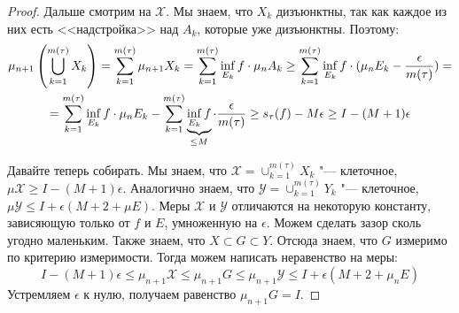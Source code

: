 \begin{proof}
	Дальше смотрим на $\mathcal{X}$.
	Мы знаем, что $X_k$ дизъюнктны, так как каждое из них есть <<надстройка>> над $A_k$, которые уже дизъюнктны.
	Поэтому:
	\begin{gather*}
	\mu_{n+1} \left( \bigcup_{k=1}^{m(\tau)} X_k \right)
	= \sum_{k=1}^{m(\tau)} \mu_{n+1} X_k
	= \sum_{k=1}^{m(\tau)} \inf_{E_k} f \cdot \mu_n A_k
	\ge \sum_{k=1}^{m(\tau)} \inf_{E_k} f \cdot (\mu_n E_k - \frac{\epsilon}{m(\tau)}) = \\
	= \sum_{k=1}^{m(\tau)} \inf_{E_k} f \cdot \mu_n E_k - \sum_{k=1}^{m(\tau)} \underbrace{\inf_{E_k} f}_{\le M} \cdot \frac{\epsilon}{m(\tau)}
	\ge s_\tau(f) - M \epsilon
	\ge I - (M+1)\epsilon
	\end{gather*}

	Давайте теперь собирать.
	Мы знаем, что $\mathcal{X} = \cup_{k=1}^{m(\tau)} X_k$ "--- клеточное, $\mu \mathcal{X} \ge I - (M+1)\epsilon$.
	Аналогично знаем, что $\mathcal{Y} = \cup_{k=1}^{m(\tau)} Y_k$ "--- клеточное, $\mu \mathcal{Y} \le I + \epsilon(M+2+\mu E)$.
	Меры $\mathcal{X}$ и $\mathcal{Y}$ отличаются на некоторую константу, зависяющую только от $f$ и $E$, умноженную на $\epsilon$.
	Можем сделать зазор сколь угодно маленьким.
	Также знаем, что $X \subset G \subset Y$.
	Отсюда знаем, что $G$ измеримо по критерию измеримости.
	Тогда можем написать неравенство на меры:
	\[
	I - (M+1)\epsilon \le \mu_{n+1}\mathcal{X} \le \mu_{n+1} G \le \mu_{n+1}\mathcal{Y} \le I + \epsilon(M+2+\mu_n E)
	\]
	Устремляем $\epsilon$ к нулю, получаем равенство $\mu_{n+1} G = I$.
\end{proof}

